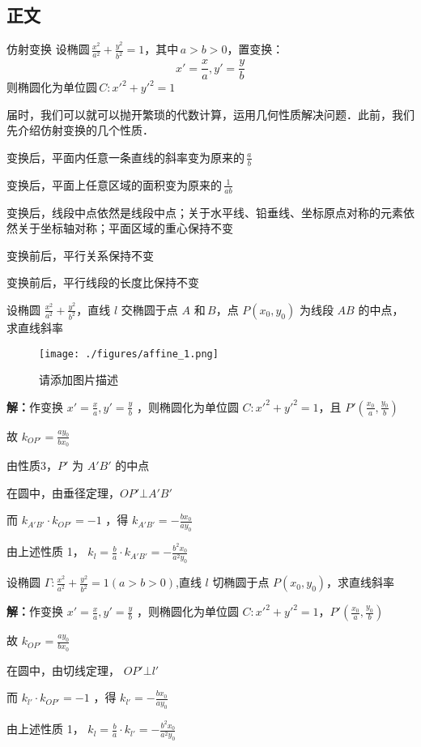 \subsection{正文}
\begin{definition}{仿射变换}
设椭圆\,\(\frac{x^2}{a^2}+\frac{y^2}{b^2}=1\)，其中\,\(a>b>0\)，置变换：
$$x'=\frac{x}{a},y'=\frac{y}{b}$$
则椭圆化为单位圆\,\(C:x'^2+y'^2=1\)
\end{definition}
届时，我们可以就可以抛开繁琐的代数计算，运用几何性质解决问题．此前，我们先介绍仿射变换的几个性质．
\begin{lemma}{}
变换后，平面内任意一条直线的斜率变为原来的\,\(\frac{a}{b}\)
\end{lemma}
\begin{lemma}{}
变换后，平面上任意区域的面积变为原来的\,\(\frac1{ab}\)
\end{lemma}
\begin{lemma}{}
变换后，线段中点依然是线段中点；关于水平线、铅垂线、坐标原点对称的元素依然关于坐标轴对称；平面区域的重心保持不变
\end{lemma}
\begin{lemma}{}
变换前后，平行关系保持不变
\end{lemma}
\begin{lemma}{}
变换前后，平行线段的长度比保持不变
\end{lemma}
\begin{corollary}{}
设椭圆 \(\frac{x^2}{a^2}+\frac{y^2}{b^2}\)，直线 \(l\) 交椭圆于点 \(A\) 和\,\(B\)，点 \(P(x_0,y_0)\) 为线段 \(AB\) 的中点，求直线斜率
\begin{figure}[ht]
\centering
\texttt{[image: ./figures/affine\_1.png]}
\caption{请添加图片描述} \label{affine_fig1}
\end{figure}

\textbf{解：}作变换 \(x'=\frac{x}{a},y'=\frac{y}{b}\) ，则椭圆化为单位圆 \(C:x'^2+y'^2=1\)，且 \(P'\left(\frac{x_0}{a},\frac{y_0}{b}\right)\)

故 \(k_{OP'}=\frac{ay_0}{bx_0}\)

由性质3，\(P'\) 为 \(A'B'\) 的中点

在圆中，由垂径定理，\(OP'\bot A'B'\)

而 \(k_{A'B'}\cdot k_{OP'}=-1\) ，得 \(k_{A'B'}=-\frac{bx_0}{ay_0}\)

由上述性质 1， \(k_l=\frac{b}{a}\cdot k_{A'B'}=-\frac{b^2x_0}{a^2y_0}\)
\end{corollary}
\begin{corollary}{}
设椭圆   \(\Gamma:\frac{x^2}{a^2}+\frac{y^2}{b^2}=1(a>b>0)\),直线 \(l\) 切椭圆于点 \(P(x_0,y_0)\)，求直线斜率 

\textbf{解：}作变换 \(x'=\frac{x}{a},y'=\frac{y}{b}\) ，则椭圆化为单位圆 \(C:x'^2+y'^2=1\)，\(P'\left(\frac{x_0}{a},\frac{y_0}{b}\right)\) 

故  \(k_{OP'}=\frac{ay_0}{bx_0}\) 

在圆中，由切线定理， \(OP'\bot l'\) 

而  \(k_{l'}\cdot k_{OP'}=-1\) ，得 \(k_{l'}=-\frac{bx_0}{ay_0}\) 

由上述性质 1， \(k_l=\frac{b}{a}\cdot k_{l'}=-\frac{b^2x_0}{a^2y_0}\) 

\end{corollary}

